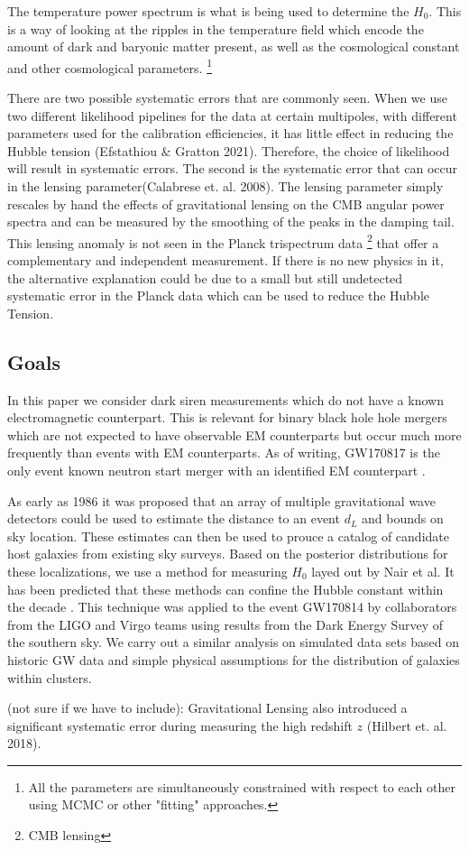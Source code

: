 The temperature power spectrum is what is being used to determine the $H_0$. This is a way of looking at the ripples in the temperature field which encode the amount of dark and baryonic matter present, as well as the cosmological constant and other cosmological parameters.
\footnote{All the parameters are simultaneously constrained with respect to each other using MCMC or other "fitting" approaches. }

There are two possible systematic errors that are commonly seen. When we use two different likelihood pipelines for the data at certain multipoles, with different parameters used for the calibration efficiencies, it has little effect in reducing the Hubble tension (Efstathiou $\&$ Gratton 2021). Therefore, the choice of likelihood will result in systematic errors. 
The second is the systematic error that can occur in the lensing parameter(Calabrese et. al. 2008). The lensing parameter simply rescales by hand the effects of gravitational lensing on the CMB angular power spectra and can be measured by the smoothing of the peaks in the damping tail. This lensing anomaly is not seen in the
Planck trispectrum data \footnote{CMB lensing} that offer a complementary and independent measurement. If there is no new physics in it, the alternative explanation could be due to a small but still undetected systematic error in the Planck data which can be used to reduce the Hubble Tension.

\subsection{\label{Goals} Goals}
In this paper we consider dark siren measurements which do not have a known electromagnetic counterpart. This is relevant for binary black hole hole mergers which are not expected to have observable EM counterparts but occur much more frequently than events with EM counterparts. As of writing, GW170817 is the only event known neutron start merger with an identified EM counterpart \cite{GW170817_announce}.

As early as 1986 it was proposed that an array of multiple gravitational wave detectors could be used to estimate the distance to an event $d_L$ and bounds on sky location\cite{Schutz_1986}. These estimates can then be used to prouce a catalog of candidate host galaxies from existing sky surveys. Based on the posterior distributions for these localizations, we use a method for measuring $H_0$ layed out by Nair et al\cite{Nair_2018}. It has been predicted that these methods can confine the Hubble constant within the decade \cite{Chen_2018}. This technique was applied to the event GW170814 by collaborators from the LIGO and Virgo teams using results from the Dark Energy Survey of the southern sky\cite{GW170814_DES}. We carry out a similar analysis on simulated data sets based on historic GW data and simple physical assumptions for the distribution of galaxies within clusters.

(not sure if we have to include):
Gravitational Lensing also introduced a significant systematic error during measuring the high redshift $z$ (Hilbert et. al. 2018). 
